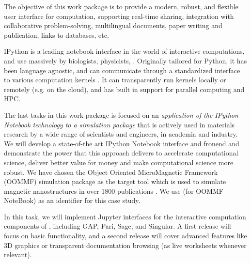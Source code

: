 \begin{workpackage}[id=UI,wphases=24-48,
  title=User Interfaces,
  PSRM=1,
  JURM=12, %
  USHRM=12, %
  LLRM=1, %
  SARM=1, %
  UKRM=1, %
  UBRM=1, %
  USORM=25] %

\begin{wpobjectives}
  The objective of this work package is to provide a modern, robust,
  and flexible user interface for computation, supporting real-time
  sharing, integration with collaborative problem-solving,
  multilingual documents, paper writing and publication, links to
  databases, etc.
\end{wpobjectives}

\begin{wpdescription}


  IPython is a leading notebook interface in the world of interactive
  computations, and use massively by biologists, physicists, . Originally tailored for Python, it has been
  language agnostic, and can communicate through a standardized
  interface to various computation kernels . It can
  transparently run kernels locally or remotely (e.g. on the cloud),
  and has built in support for parallel computing and HPC.

  The last tasks in this work package is focused on an
  \emph{application of the IPython Notebook technology to a simulation
    package} that is actively used in materials research by a wide
  range of scientists and engineers, in academia and industry. We will
  develop a state-of-the art IPython Notebook interface and fronend
  and demonstrate the power that this approach delivers to accelerate
  computational science, deliver better value for money and make
  computational science more robust.  We have chosen the Object
  Oriented MicroMagnetic Framework (OOMMF) simulation package
  \cite{OOMMF-url} as the target tool which is used to simulate
  magnetic nanostructures in over 1800 publications
  \cite{OOMMF-citations-url}. We use \OOMMFNB{} (for OOMMF NoteBook) as
  an identifier for this case study.

\end{wpdescription}

\begin{tasklist}
\begin{task}[title=Uniform notebook interface for all interactive components,id=ipython_kernels]
  In this task, we will implement Jupyter interfaces for the
  interactive computation components of \TheProject, including GAP,
  Pari, Sage, and Singular. A first release
   will focus on basic functionality,
  and a second release  will cover advanced
  features like 3D graphics or transparent documentation browsing (as
  live worksheets whenever relevant).


\end{task}
\end{tasklist}
\end{workpackage}
